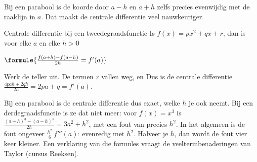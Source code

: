 Bij een parabool is de koorde door $a - h$ en $a + h$ zelfs precies evenwijdig met de raaklijn in $a$. Dat maakt de centrale differentie veel nauwkeuriger.

\begin{theorie}
\begin{stelling}{Centrale differentie bij een tweedegraadsfunctie}
Is $f(x) = px^2 + qx + r$, dan is voor elke $a$ en elke $h > 0$

\vspace{1mm}
\qquad $\formule{\frac{f(a + h) - f(a - h)}{2h} = f'(a)}$
\end{stelling}

\begin{bewijs}
Werk de teller uit. De termen $r$ vallen weg, en
Dus is de centrale differentie $\frac{4pah + 2qh}{2h} = 2pa + q = f'(a)$.
\end{bewijs}
\end{theorie}

Bij een parabool is de centrale differentie dus exact, welke $h$ je ook neemt. Bij een derdegraadsfunctie is ze dat niet meer: voor $f(x) = x^3$ is $\frac{(a + h)^3 - (a - h)^3}{2h} = 3a^2 + h^2$, met een fout van precies $h^2$. In het algemeen is de fout ongeveer $\frac{h^2}{6}\,f'''(a)$: evenredig met $h^2$. Halveer je $h$, dan wordt de fout vier keer kleiner. Een verklaring van die formules vraagt de veeltermbenaderingen van Taylor (cursus Reeksen).


